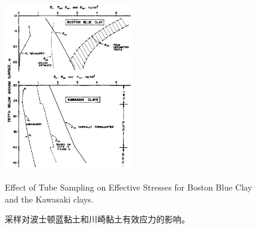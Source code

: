 \begin{figure}[!htb]
    \centering
    \includegraphics[width=0.5\textwidth]{figures/figure-4.png}
    \caption{Effect of Tube Sampling on Effective Stresses for Boston Blue Clay and the Kawasaki clays.}
    \addtocounter{figure}{-1}
    \vspace{-5pt}
    \renewcommand{\figurename}{图}
    \caption{采样对波士顿蓝黏土和川崎黏土有效应力的影响。}
    \renewcommand{\figurename}{Figure}
    \label{figure:4}
\end{figure}
